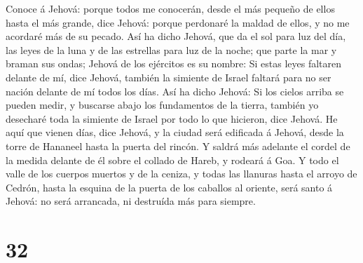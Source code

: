 Conoce á Jehová: porque todos me conocerán, desde el más pequeño de
ellos hasta el más grande, dice Jehová: porque perdonaré la maldad de
ellos, y no me acordaré más de su pecado.  Así ha dicho
Jehová, que da el sol para luz del día, las leyes de la luna y de las
estrellas para luz de la noche; que parte la mar y braman sus ondas;
Jehová de los ejércitos es su nombre:  Si estas leyes
faltaren delante de mí, dice Jehová, también la simiente de Israel
faltará para no ser nación delante de mí todos los días. 
Así ha dicho Jehová: Si los cielos arriba se pueden medir, y buscarse
abajo los fundamentos de la tierra, también yo desecharé toda la
simiente de Israel por todo lo que hicieron, dice Jehová. 
He aquí que vienen días, dice Jehová, y la ciudad será edificada á
Jehová, desde la torre de Hananeel hasta la puerta del rincón.
 Y saldrá más adelante el cordel de la medida delante de él
sobre el collado de Hareb, y rodeará á Goa.  Y todo el
valle de los cuerpos muertos y de la ceniza, y todas las llanuras hasta
el arroyo de Cedrón, hasta la esquina de la puerta de los caballos al
oriente, será santo á Jehová: no será arrancada, ni destruída más para
siempre.

\hypertarget{section-31}{%
\section{32}\label{section-31}}

